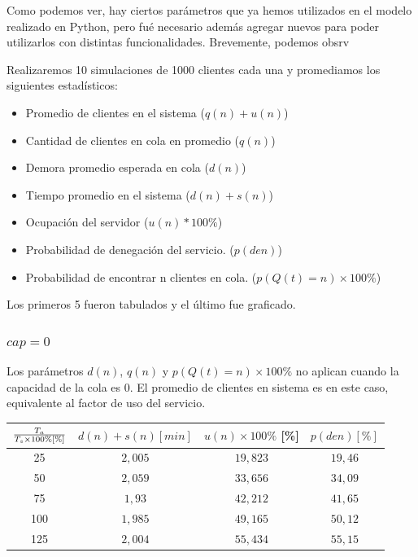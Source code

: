     Como podemos ver, hay ciertos parámetros que ya hemos utilizados en el modelo realizado en Python, pero fué necesario además agregar nuevos para poder utilizarlos con distintas funcionalidades.
    Brevemente, podemos obsrv

    Realizaremos 10 simulaciones de 1000 clientes cada una y promediamos los siguientes estadísticos:
    \begin{itemize}
        \item Promedio de clientes en el sistema ($q(n)+u(n)$)
        \item Cantidad de clientes en cola en promedio ($q(n)$)
        \item Demora promedio esperada en cola ($d(n)$)
        \item Tiempo promedio en el sistema ($d(n)+s(n)$)
        \item Ocupación del servidor ($u(n)*100\%$)
        \item Probabilidad de denegación del servicio. ($p(den)$)
        \item Probabilidad de encontrar n clientes en cola. ($p(Q(t)=n)\times100\%$)
    \end{itemize}

    Los primeros 5 fueron tabulados y el último fue graficado.

    \subsubsection{$cap = 0$}

    Los parámetros $d(n)$, $q(n)$ y $p(Q(t)=n)\times100\%$ no aplican cuando la capacidad de la cola es 0.
    El promedio de clientes en sistema es en este caso, equivalente al factor de uso del servicio.

    \begin{tabular}{||c||c|c|c||}
        \hline \hline
        $T_a \over T_s\times100\% [\%]$ & $d(n)+s(n) [min]$ & $u(n)\times100\%$ [\%] & $p(den) [\%]$ \\
        \hline \hline
        25 & $2,005$ & $19,823$ & $19,46$ \\
        \hline
        50 & $2,059$ & $33,656$ & $34,09$ \\
        \hline
        75 & $1,93$ & $42,212$ & $41,65$ \\
        \hline
        100 & $1,985$ & $49,165$ & $50,12$ \\
        \hline
        125 & $2,004$ & $55,434$ & $55,15$ \\
        \hline \hline
    \end{tabular}

